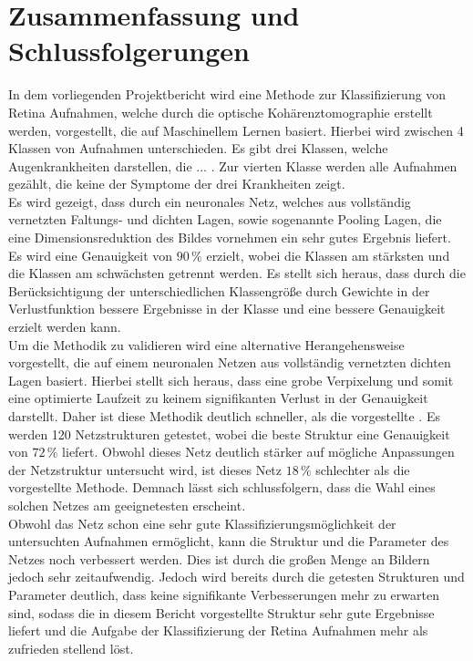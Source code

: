 \section{Zusammenfassung und Schlussfolgerungen}

In dem vorliegenden Projektbericht wird eine Methode zur Klassifizierung von Retina Aufnahmen, welche durch die optische Kohärenztomographie erstellt werden, vorgestellt, die auf Maschinellem Lernen basiert. Hierbei wird zwischen 4 Klassen von Aufnahmen unterschieden. Es gibt drei Klassen, welche Augenkrankheiten darstellen, die ... . Zur vierten Klasse werden alle Aufnahmen gezählt, die keine der Symptome der drei Krankheiten zeigt. \\
Es wird gezeigt, dass durch ein neuronales Netz, welches aus vollständig vernetzten Faltungs- und dichten Lagen, sowie sogenannte Pooling Lagen, die eine Dimensionsreduktion des Bildes vornehmen ein sehr gutes Ergebnis liefert. Es wird eine Genauigkeit von $90\,\%$ erzielt, wobei die Klassen am stärksten und die Klassen am schwächsten getrennt werden. Es stellt sich heraus, dass durch die Berücksichtigung der unterschiedlichen Klassengröße durch Gewichte in der Verlustfunktion bessere Ergebnisse in der Klasse und eine bessere Genauigkeit erzielt werden kann. \\
Um die Methodik zu validieren wird eine alternative Herangehensweise vorgestellt, die auf einem neuronalen Netzen aus vollständig vernetzten dichten Lagen basiert. Hierbei stellt sich heraus, dass eine grobe Verpixelung und somit eine optimierte Laufzeit zu keinem signifikanten Verlust in der Genauigkeit darstellt. Daher ist diese Methodik deutlich schneller, als die vorgestellte . Es werden 120 Netzstrukturen getestet, wobei die beste Struktur eine Genauigkeit von $72\,\%$ liefert. Obwohl dieses Netz deutlich stärker auf mögliche Anpassungen der Netzstruktur untersucht wird, ist dieses Netz $18\,\%$ schlechter als die vorgestellte Methode. Demnach lässt sich schlussfolgern, dass die Wahl eines solchen Netzes am geeignetesten erscheint. \\
Obwohl das Netz schon eine sehr gute Klassifizierungsmöglichkeit der untersuchten Aufnahmen ermöglicht, kann die Struktur und die Parameter des Netzes noch verbessert werden. Dies ist durch die großen Menge an Bildern jedoch sehr zeitaufwendig. Jedoch wird bereits durch die getesten Strukturen und Parameter deutlich, dass keine signifikante Verbesserungen mehr zu erwarten sind, sodass die in diesem Bericht vorgestellte Struktur sehr gute Ergebnisse liefert und die Aufgabe der Klassifizierung der Retina Aufnahmen mehr als zufrieden stellend löst. 
